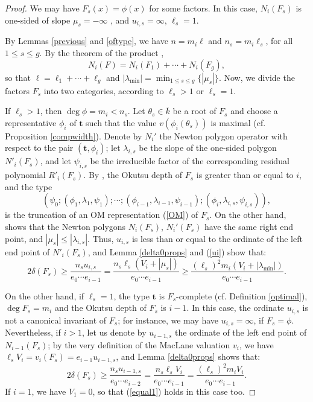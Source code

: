 \documentclass{amsart}
\begin{document}
\begin{proof}
We may have $F_s(x)=\phi(x)$ for some factors. In this case, $N_i(F_s)$ is one-sided of slope $\mu_s=-\infty$ \cite[Sec. 1.1]{HN}, and $u_{i,s}=\infty$, $\ell_s=1$. 

By Lemmas \ref{previous} and \ref{oftype}, we have $n=m_i\ell$ and $n_s=m_i\ell_s$, for all $1\le s\le g$.
By the theorem of the product \cite[Thm. 2.26]{HN}, 
\begin{equation}\label{product}
N_i(F)=N_i(F_1)+\cdots+N_i(F_g),
\end{equation}
so that $\ell=\ell_1+\cdots+\ell_g$ and $|{\lambda_{\operatorname{min}}}|=\min_{1\le s \le g}\{|\mu_s|\}$.
Now, we divide the factors $F_s$ into two categories, according to $\ell_s>1$ or $\ell_s=1$. 

If $\ell_s>1$, then $\deg\phi=m_i<n_s$. Let ${\theta}_s\in\overline{k}$ be a root of $F_s$ and choose a representative $\phi_i$ of ${\mathbf{t}}$ such that the value $v(\phi_i({\theta}_s))$ is maximal (cf. Proposition \ref{compwidth}). Denote by $N_i'$ the Newton polygon operator with respect to the pair $({\mathbf{t}},\phi_i)$; let $\lambda_{i,s}$ be the slope of the one-sided polygon $N'_i(F_s)$, and let $\psi_{i,s}$ be the irreducible factor of the corresponding residual polynomial $R'_i(F_s)$. By \cite[Thm. 3.9]{okutsu}, the Okutsu depth of $F_s$ is greater than or equal to $i$, and the type 
$$
(\psi_0;(\phi_1,\lambda_1,\psi_1);\cdots;(\phi_{i-1},\lambda_{i-1},\psi_{i-1});(\phi_i,\lambda_{i,s},\psi_{i,s})), 
$$
is the truncation of an OM representation (\ref{OM}) of $F_s$. On the other hand, \cite[Thm. 3.1]{algorithm} shows that the Newton polygons $N_i(F_s)$, $N_i'(F_s)$ have the same right end point, and $|\mu_s|\le|\lambda_{i,s}|$. Thus, $u_{i,s}$ is less than or equal to the ordinate of the left end point of $N'_i(F_s)$, and Lemma \ref{delta0props} and (\ref{ui}) show that:
\begin{equation}\label{greater1}
 2\delta(F_s)\ge \dfrac{n_su_{i,s}}{e_0\cdots e_{i-1}}=\dfrac{n_s\ell_s(V_i+|\mu_s|)}{e_0\cdots e_{i-1}}\ge\dfrac{(\ell_s)^2m_i(V_i+|{\lambda_{\operatorname{min}}}|)}{e_0\cdots e_{i-1}}.
\end{equation}

On the other hand, if $\ell_s=1$, the type ${\mathbf{t}}$ is $F_s$-complete (cf. Definition \ref{optimal}), $\deg F_s=m_i$ and the Okutsu depth of $F_s$ is $i-1$. In this case,  the ordinate $u_{i,s}$ is not a canonical invariant of $F_s$; for instance, we may have $u_{i,s}=\infty$, if $F_s=\phi$. Nevertheless, if $i>1$, let us denote by $u_{i-1,s}$ the ordinate of the left end point of $N_{i-1}(F_s)$; by the very definition of the MacLane valuation $v_i$, we have $\ell_sV_i=v_i(F_s)=e_{i-1}u_{i-1,s}$, and Lemma \ref{delta0props} shows that: 
\begin{equation}\label{equal1}
 2\delta(F_s)\ge\dfrac{n_su_{i-1,s}}{e_0\cdots e_{i-2}}=\dfrac{n_s\ell_sV_i}{e_0\cdots e_{i-1}}=\dfrac{(\ell_s)^2m_iV_i}{e_0\cdots e_{i-1}}.
\end{equation}
If $i=1$, we have $V_1=0$, so that (\ref{equal1}) holds in this case too.  


\end{proof}
\end{document}
